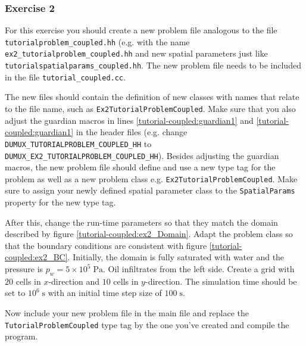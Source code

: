 \subsubsection{Exercise 2}
For this exercise you should create a new problem file analogous to
the file \texttt{tutorialproblem\_coupled.hh} (e.g. with the name
\texttt{ex2\_tutorialproblem\_coupled.hh} and new spatial parameters
just like \texttt{tutorialspatialparams\_coupled.hh}. The new
problem file needs to
be included in the file \texttt{tutorial\_coupled.cc}.

The new files should contain the definition of new classes with names
that relate to the file name, such as
\texttt{Ex2TutorialProblemCoupled}. Make sure that you also adjust the
guardian macros in lines \ref{tutorial-coupled:guardian1} and
\ref{tutorial-coupled:guardian1}
in the header files (e.g. change
\mbox{\texttt{DUMUX\_TUTORIALPROBLEM\_COUPLED\_HH}} to\\
\mbox{\texttt{DUMUX\_EX2\_TUTORIALPROBLEM\_COUPLED\_HH}}). 
Besides adjusting the guardian macros, the new problem file should define and
use a new type tag for the problem as well as a new problem class
e.g. \mbox{\texttt{Ex2TutorialProblemCoupled}}. Make sure to assign your
newly defined spatial parameter class to the
\texttt{SpatialParams} property for the new
type tag. 

After this, change the run-time parameters so that they match the
domain described by figure \ref{tutorial-coupled:ex2_Domain}. Adapt
the problem class so that the boundary conditions are consistent with
figure \ref{tutorial-coupled:ex2_BC}. Initially, the domain is fully
saturated with water and the pressure is $p_w = 5 \times
10^5\;\text{Pa}$.  Oil infiltrates from the left side. Create a grid
with $20$ cells in $x$-direction and $10$ cells in $y$-direction. The
simulation time should be set to $10^6\;\text{s}$ with an
initial time step size of $100\;\text{s}$.

Now include your new problem file in the main file and replace the
\texttt{TutorialProblemCoupled} type tag by the one you've created and
compile the program.


